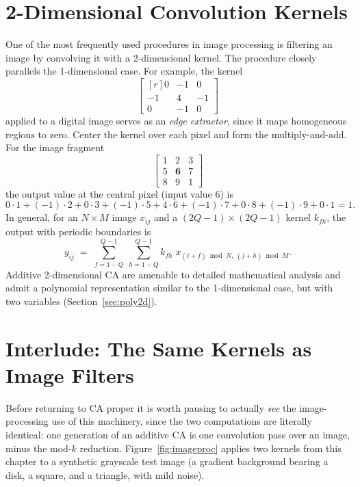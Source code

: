 \section{2-Dimensional Convolution Kernels}

One of the most frequently used procedures in image processing is
filtering an image by convolving it with a 2-dimensional kernel.  The
procedure closely parallels the 1-dimensional case.  For example, the
kernel
\[
  \begin{bmatrix*}[r] 0 & -1 & 0\\ -1 & 4 & -1\\ 0 & -1 & 0
  \end{bmatrix*}
\]
applied to a digital image serves as an \emph{edge extractor}, since it
maps homogeneous regions to zero.  Center the kernel over each pixel
and form the multiply-and-add.  For the image fragment
\[
  \begin{bmatrix} 1 & 2 & 3\\ 5 & \mathbf{6} & 7\\ 8 & 9 & 1
  \end{bmatrix}
\]
the output value at the central pixel (input value 6) is
\[
  0\cdot1 + (-1)\cdot2 + 0\cdot3
  + (-1)\cdot5 + 4\cdot6 + (-1)\cdot7
  + 0\cdot8 + (-1)\cdot9 + 0\cdot1 = 1 .
\]
In general, for an $N\times M$ image $x_{ij}$ and a
$(2Q\!-\!1)\times(2Q\!-\!1)$ kernel $k_{fh}$, the output with periodic
boundaries is
\begin{equation}
  y_{ij} \;=\; \sum_{f=1-Q}^{Q-1}\ \sum_{h=1-Q}^{Q-1}
     k_{fh}\; x_{(i+f)\bmod N,\ (j+h)\bmod M}.
\end{equation}
Additive 2-dimensional CA are amenable to detailed mathematical
analysis and admit a polynomial representation similar to the
1-dimensional case, but with two variables
(Section~\ref{sec:poly2d}).

\section{Interlude: The Same Kernels as Image Filters}
\label{sec:imageproc}

Before returning to CA proper it is worth pausing to actually
\emph{see} the image-processing use of this machinery, since the two
computations are literally identical: one generation of an additive CA
is one convolution pass over an image, minus the mod-$k$ reduction.
Figure~\ref{fig:imageproc} applies two kernels from this chapter to a
synthetic grayscale test image (a gradient background bearing a disk, a
square, and a triangle, with mild noise).

